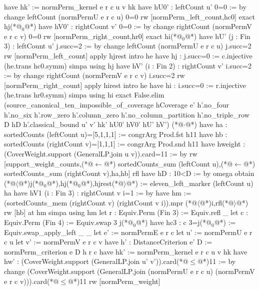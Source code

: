         have hk' := normPerm_kernel e r c u v hk
        have hU0' : leftCount u' 0=0 := by
          change leftCount (normPermU e r c u) 0=0
          rw [normPerm_left_count,hc0]
          exact hj(*@${}_0$@*)
        have hV0' : rightCount v' 0=0 := by
          change rightCount (normPermV e r c v) 0=0
          rw [normPerm_right_count,hr0]
          exact hi(*@${}_0$@*)
        have hU' (j : Fin 3) : leftCount u' j.succ=2 := by
          change leftCount (normPermU e r c u) j.succ=2
          rw [normPerm_left_count]
          apply hjrest
          intro he
          have hj : j.succ=0 := c.injective (he.trans hc0.symm)
          simpa using hj
        have hV' (i : Fin 2) : rightCount v' i.succ=2 := by
          change rightCount (normPermV e r c v) i.succ=2
          rw [normPerm_right_count]
          apply hirest
          intro he
          have hi : i.succ=0 := r.injective (he.trans hr0.symm)
          simpa using hi
        exact False.elim (source_canonical_ten_impossible_of_coverage hCoverage e'
          h'.no_four h'.no_six h'.row_zero h'.column_zero h'.no_column_partition h'.no_triple_row
          D hD h'.classical_bound u' v' hk' hU0' hV0' hU' hV')
      (*@$\cdot$@*) have ha : sortedCounts (leftCount u)=[5,1,1,1] := congrArg Prod.fst h11
        have hb : sortedCounts (rightCount v)=[1,1,1] := congrArg Prod.snd h11
        have hweight : (CoverWeight.support (GeneralLP.join u v)).card=11 := by
          rw [support_weight_counts,(*@$\leftarrow$@*) sortedCounts_sum (leftCount u),(*@$\leftarrow$@*) sortedCounts_sum (rightCount v),ha,hb]
          rfl
        have hD : 10<D := by omega
        obtain (*@$\langle$@*)j(*@${}_0$@*),hj(*@${}_0$@*),hjrest(*@$\rangle$@*) := eleven_left_marker (leftCount u) ha
        have hV1 (i : Fin 3) : rightCount v i=1 := by
          have hm := (sortedCounts_mem (rightCount v) (rightCount v i)).mpr (*@$\langle$@*)i,rfl(*@$\rangle$@*)
          rw [hb] at hm
          simpa using hm
        let r : Equiv.Perm (Fin 3) := Equiv.refl _
        let c : Equiv.Perm (Fin 4) := Equiv.swap 3 j(*@${}_0$@*)
        have hc3 : c 3=j(*@${}_0$@*) := Equiv.swap_apply_left _ _
        let e' := normPermE e r c
        let u' := normPermU e r c u
        let v' := normPermV e r c v
        have h' : DistanceCriterion e' D := normPerm_criterion e D h r c
        have hk' := normPerm_kernel e r c u v hk
        have hw' : (CoverWeight.support (GeneralLP.join u' v')).card(*@$\le$@*)11 := by
          change (CoverWeight.support (GeneralLP.join (normPermU e r c u) (normPermV e r c v))).card(*@$\le$@*)11
          rw [normPerm_weight]
